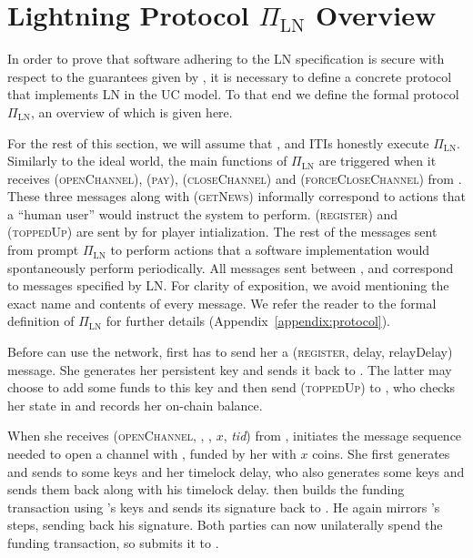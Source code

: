 \section{Lightning Protocol $\Pi_{\mathrm{LN}}$ Overview}
\label{sec:ov-lightning}

  In order to prove that software adhering to the LN specification is secure
  with respect to the guarantees given by \fpaynet, it is necessary to define a
  concrete protocol that implements LN in the UC model. To that end we define
  the formal protocol $\Pi_{\mathrm{LN}}$, an overview of which is given here.

  For the rest of this section, we will assume that \alice, \bob{} and
  \charlie{} ITIs honestly execute $\Pi_{\mathrm{LN}}$. Similarly to the ideal
  world, the main functions of $\Pi_{\mathrm{LN}}$ are triggered when it
  receives (\textsc{openChannel}), (\textsc{pay}), (\textsc{closeChannel}) and
  (\textsc{forceCloseChannel}) from \environment{}. These three messages along
  with (\textsc{getNews}) informally correspond to actions that a ``human user''
  would instruct the system to perform. (\textsc{register}) and
  (\textsc{toppedUp}) are sent by \environment{} for player intialization. The
  rest of the messages sent from \environment{} prompt $\Pi_{\mathrm{LN}}$ to
  perform actions that a software implementation would spontaneously perform
  periodically. All messages sent between \alice, \bob{} and \charlie{}
  correspond to messages specified by LN. For clarity of exposition, we avoid
  mentioning the exact name and contents of every message. We refer the reader
  to the formal definition of $\Pi_{\mathrm{LN}}$ for further details
  (Appendix~\ref{appendix:protocol}).

    Before \alice{} can use the network, \environment{} first has to send her a
    (\textsc{register}, delay, relayDelay) message. She generates her
    persistent key and sends it back to \environment{}. The latter may choose to
    add some funds to this key and then send (\textsc{toppedUp}) to \alice, who
    checks her state in \ledger{} and records her on-chain balance.

    When she receives (\textsc{openChannel}, \alice, \bob, $x$, \textit{tid})
    from \environment, \alice{} initiates the message sequence needed to open a
    channel with \bob, funded by her with $x$ coins. She first generates and
    sends to \bob{} some keys and her timelock delay, who also generates some
    keys and sends them back along with his timelock delay. \alice{} then builds
    the funding transaction using \bob's keys and sends its signature back to
    \bob. He again mirrors \alice's steps, sending back his signature. Both
    parties can now unilaterally spend the funding transaction, so \alice{}
    submits it to \ledger.

